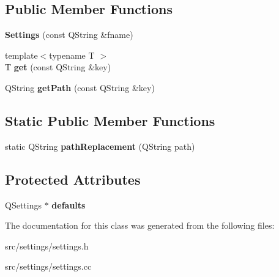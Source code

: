 \subsection*{Public Member Functions}
\begin{DoxyCompactItemize}
\item 
{\bfseries Settings} (const Q\+String \&fname)\hypertarget{classsettings_1_1Settings_a6d0693a72a839764c058c676a0312615}{}\label{classsettings_1_1Settings_a6d0693a72a839764c058c676a0312615}

\item 
{\footnotesize template$<$typename T $>$ }\\T {\bfseries get} (const Q\+String \&key)\hypertarget{classsettings_1_1Settings_ad33c928f72ce226379fb89fde5fda199}{}\label{classsettings_1_1Settings_ad33c928f72ce226379fb89fde5fda199}

\item 
Q\+String {\bfseries get\+Path} (const Q\+String \&key)\hypertarget{classsettings_1_1Settings_ac19ac5bdc6521bfb66dbb6e527544652}{}\label{classsettings_1_1Settings_ac19ac5bdc6521bfb66dbb6e527544652}

\end{DoxyCompactItemize}
\subsection*{Static Public Member Functions}
\begin{DoxyCompactItemize}
\item 
static Q\+String {\bfseries path\+Replacement} (Q\+String path)\hypertarget{classsettings_1_1Settings_a876020f5ae3e6a4667c2d8741a96ee70}{}\label{classsettings_1_1Settings_a876020f5ae3e6a4667c2d8741a96ee70}

\end{DoxyCompactItemize}
\subsection*{Protected Attributes}
\begin{DoxyCompactItemize}
\item 
Q\+Settings $\ast$ {\bfseries defaults}\hypertarget{classsettings_1_1Settings_a2946d17f929a8c0880cd229ae1a691ba}{}\label{classsettings_1_1Settings_a2946d17f929a8c0880cd229ae1a691ba}

\end{DoxyCompactItemize}


The documentation for this class was generated from the following files\+:\begin{DoxyCompactItemize}
\item 
src/settings/settings.\+h\item 
src/settings/settings.\+cc\end{DoxyCompactItemize}
